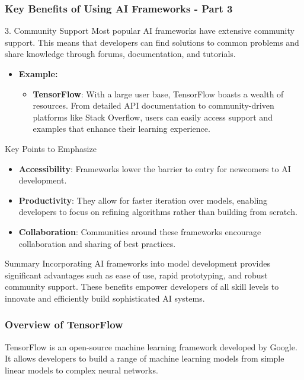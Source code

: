 \documentclass{beamer}
\begin{document}
\begin{frame}[fragile]
    \frametitle{Key Benefits of Using AI Frameworks - Part 3}
    \begin{block}{3. Community Support}
        Most popular AI frameworks have extensive community support. This means that developers can find solutions to common problems and share knowledge through forums, documentation, and tutorials.
        
        \begin{itemize}
            \item \textbf{Example:}
            \begin{itemize}
                \item \textbf{TensorFlow}: With a large user base, TensorFlow boasts a wealth of resources. From detailed API documentation to community-driven platforms like Stack Overflow, users can easily access support and examples that enhance their learning experience.
            \end{itemize}
        \end{itemize}
    \end{block}
    
    \begin{block}{Key Points to Emphasize}
        \begin{itemize}
            \item \textbf{Accessibility}: Frameworks lower the barrier to entry for newcomers to AI development.
            \item \textbf{Productivity}: They allow for faster iteration over models, enabling developers to focus on refining algorithms rather than building from scratch.
            \item \textbf{Collaboration}: Communities around these frameworks encourage collaboration and sharing of best practices.
        \end{itemize}
    \end{block}
    
    \begin{block}{Summary}
        Incorporating AI frameworks into model development provides significant advantages such as ease of use, rapid prototyping, and robust community support. These benefits empower developers of all skill levels to innovate and efficiently build sophisticated AI systems.
    \end{block}
\end{frame}

\begin{frame}
    \frametitle{Overview of TensorFlow}
    TensorFlow is an open-source machine learning framework developed by Google. It allows developers to build a range of machine learning models from simple linear models to complex neural networks.
\end{frame}
\end{document}
